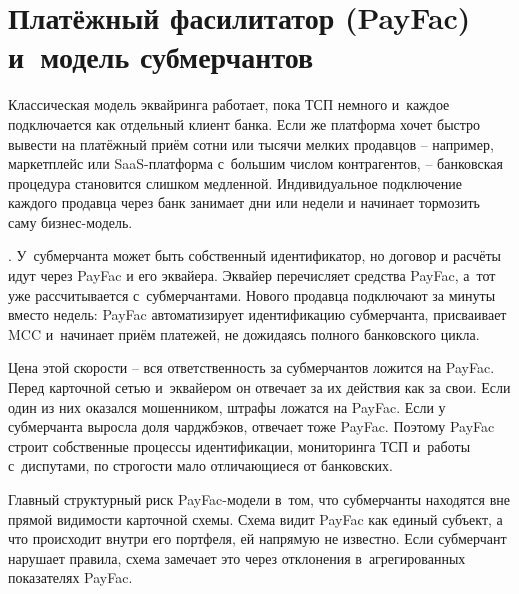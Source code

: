 \section{Платёжный фасилитатор (PayFac) и~модель субмерчантов}\label{sec:ia-payfac}

Классическая модель эквайринга работает, пока ТСП немного и~каждое
подключается как отдельный клиент банка. Если же платформа хочет
быстро вывести на платёжный приём сотни или тысячи мелких продавцов
-- например, маркетплейс или SaaS-платформа с~большим числом
контрагентов, -- банковская процедура становится слишком медленной.
Индивидуальное подключение каждого продавца через банк занимает дни
или недели и начинает тормозить саму бизнес-модель.

. У~субмерчанта может быть
собственный идентификатор, но договор и расчёты идут через PayFac
и его эквайера. Эквайер перечисляет средства
PayFac, а~тот уже рассчитывается с~субмерчантами. Нового продавца
подключают за минуты вместо недель: PayFac автоматизирует
идентификацию субмерчанта, присваивает MCC и~начинает приём платежей,
не дожидаясь полного банковского
цикла.~\cite{visa-acceptance-entities,visa-payment-facilitator-marketplace-risk-guide}

Цена этой скорости -- вся ответственность за субмерчантов ложится на PayFac. Перед карточной сетью и~эквайером он отвечает за их действия как за свои. Если один
из них оказался мошенником, штрафы ложатся на PayFac. Если у
субмерчанта выросла доля чарджбэков, отвечает тоже PayFac. Поэтому
PayFac строит собственные процессы идентификации, мониторинга ТСП и~работы
с~диспутами, по строгости мало отличающиеся от
банковских.~\cite{visa-acceptance-entities,visa-payment-facilitator-marketplace-risk-guide}

Главный структурный риск PayFac-модели в~том, что субмерчанты
находятся вне прямой видимости карточной схемы. Схема видит PayFac
как единый субъект, а что происходит внутри его портфеля, ей напрямую
не известно. Если субмерчант нарушает правила, схема замечает это
через отклонения в~агрегированных показателях PayFac.

